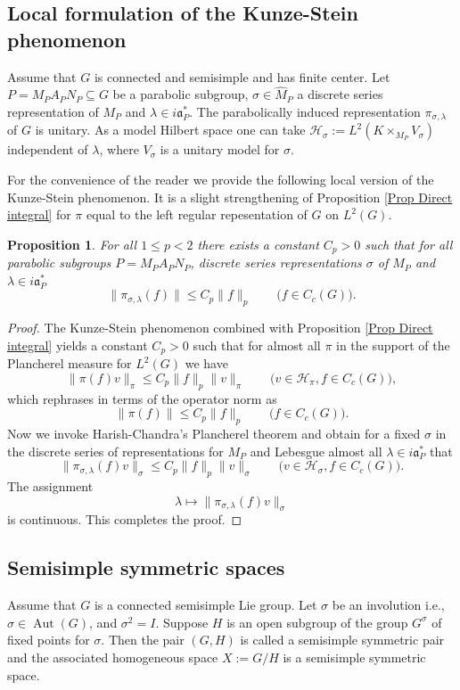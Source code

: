 \documentclass[12pt,letterpaper,titlepage,reqno]{amsart}
\theoremstyle{plain}
\newtheorem{prop}[theorem]{Proposition}
\theoremstyle{definition}
\numberwithin{equation}{section}
\newcommand{\cH}{\mathcal{H}}
\newcommand{\Aut}{\operatorname{Aut}}
\def\hat{\widehat}
\def\af{\mathfrak{a}}
\begin{document}
\subsection{Local formulation of the Kunze-Stein phenomenon}
Assume that $G$ is connected and semisimple and has finite center.
Let $P=M_{P}A_{P}N_{P}\subseteq G$ be a parabolic subgroup, $\sigma\in \hat{M}_{P}$ a discrete series representation of $M_{P}$ and $\lambda\in i\af_{P}^{*}$. The parabolically induced representation $\pi_{\sigma,\lambda}$ of $G$ is unitary. As a model Hilbert space one can take $\cH_{\sigma}:=L^{2}(K\times_{M_{P}}V_{\sigma})$ independent of $\lambda$, where $V_{\sigma}$ is a unitary model for $\sigma$. 

For the convenience of the reader we provide the following local version of the Kunze-Stein phenomenon. It is a slight strengthening of Proposition \ref{Prop Direct integral} for $\pi$ equal to the left regular repesentation of $G$ on $L^{2}(G)$.

\begin{prop}\label{Prop tempered reps}
For all $1\leq p<2$ there exists a constant $C_{p}>0$ such that for all parabolic subgroups $P=M_{P}A_{P}N_{P}$, discrete series representations $\sigma$ of $M_{P}$ and $\lambda\in i\af_{P}^{*}$
$$
\|\pi_{\sigma,\lambda}(f)\|\leq C_{p}\|f\|_{p}\qquad \big(f\in C_{c}(G)\big).
$$
\end{prop}

\begin{proof}
The Kunze-Stein phenomenon combined with Proposition \ref{Prop Direct integral} yields a constant $C_{p}>0$ such that for almost all $\pi$ in the support of the Plancherel measure for $L^{2}(G)$ we have
$$
\|\pi(f)v\|_{\pi}\leq C_{p}\|f\|_{p}\|v\|_{\pi}\qquad\big(v\in \cH_{\pi},f\in C_{c}(G) \big),
$$
which rephrases in terms of the operator norm as
$$
\|\pi(f)\|\leq C_{p}\|f\|_{p}\qquad\big(f\in C_{c}(G) \big).
$$
Now we invoke Harish-Chandra's Plancherel theorem and obtain for a fixed $\sigma$ in the discrete series of representations for $M_{P}$ and  Lebesgue almost all $\lambda\in i\af_{P}^{*}$ that
$$
\|\pi_{\sigma,\lambda}(f)v\|_{\sigma}\leq C_{p}\|f\|_{p}\|v\|_{\sigma}\qquad\big(v\in \cH_{\sigma},f\in C_{c}(G) \big).
$$
The assignment
$$
\lambda\mapsto \|\pi_{\sigma,\lambda}(f)v\|_{\sigma}
$$
is continuous. This completes the proof.
\end{proof}

\subsection{Semisimple symmetric spaces}
Assume that $G$ is a connected semisimple Lie group. Let $\sigma$ be an involution i.e., $\sigma\in \Aut(G)$, and $\sigma^2=I$. Suppose $H$ is an open subgroup of the group $G^\sigma$ of fixed points for $\sigma$. Then the pair $(G,H)$ is called a semisimple symmetric pair and the associated homogeneous space $X:=G/H$ is a semisimple symmetric space.
\end{document}
